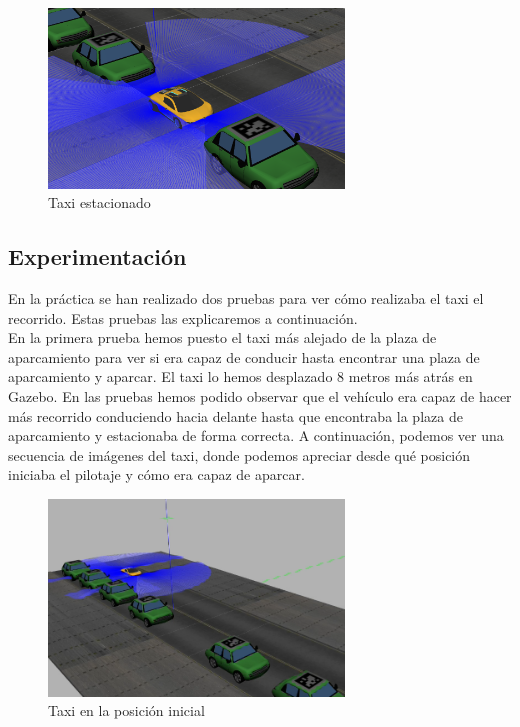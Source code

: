 \begin{figure}[H]
  \begin{center}
    \includegraphics[width=0.7\textwidth]{figures/Autopark/Posicion5.png}
		\caption{Taxi estacionado}
		\label{fig.Posicion5}
		\end{center}
\end{figure}

\subsection{Experimentación}
En la práctica se han realizado dos pruebas para ver cómo realizaba el taxi el recorrido. Estas pruebas las explicaremos a continuación.\\

En la primera prueba hemos puesto el taxi más alejado de la plaza de aparcamiento para ver si era capaz de conducir hasta encontrar una plaza de aparcamiento y aparcar. El taxi lo hemos desplazado 8 metros más atrás en Gazebo. En las pruebas hemos podido observar que el vehículo era capaz de hacer más recorrido conduciendo hacia delante hasta que encontraba la plaza de aparcamiento y estacionaba de forma correcta. A continuación, podemos ver una secuencia de imágenes del taxi, donde podemos apreciar desde qué posición iniciaba el pilotaje y cómo era capaz de aparcar.\\

\begin{figure}[H]
  \begin{center}
    \includegraphics[width=0.7\textwidth]{figures/Autopark/Experimento1_1.png}
		\caption{Taxi en la posición inicial}
		\label{fig.Experimento1_1}
		\end{center}
\end{figure}

